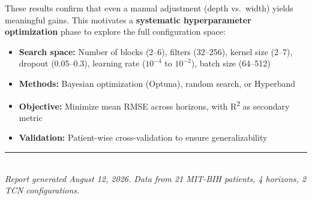 \documentclass[11pt, a4paper]{article}
\begin{document}
These results confirm that even a manual adjustment (depth vs.\ width) yields meaningful gains. This motivates a \textbf{systematic hyperparameter optimization} phase to explore the full configuration space:

\begin{itemize}[nosep]
    \item \textbf{Search space:} Number of blocks (2--6), filters (32--256), kernel size (2--7), dropout (0.05--0.3), learning rate ($10^{-4}$ to $10^{-2}$), batch size (64--512)
    \item \textbf{Methods:} Bayesian optimization (Optuna), random search, or Hyperband
    \item \textbf{Objective:} Minimize mean RMSE across horizons, with R\textsuperscript{2} as secondary metric
    \item \textbf{Validation:} Patient-wise cross-validation to ensure generalizability
\end{itemize}

\vspace{1em}
\noindent\textcolor{nublue}{\rule{\linewidth}{0.8pt}}\\[4pt]
\noindent\textit{Report generated August 12, 2026. Data from 21 MIT-BIH patients, 4 horizons, 2 TCN configurations.}
\end{document}
